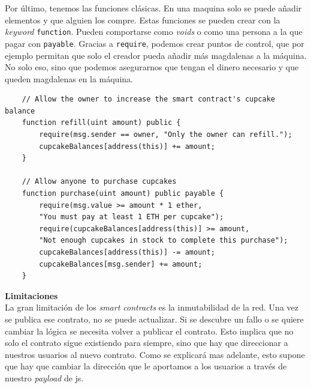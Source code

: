 Por último, tenemos las funciones clásicas. En una maquina solo se puede añadir elementos y que alguien los compre. Estas funciones se pueden crear con la \textit{keyword} \verb|function|. Pueden comportarse como \textit{voids} o como una persona a la que pagar con \verb|payable|.
Gracias a \verb|require|, podemos crear puntos de control, que por ejemplo permitan que solo el creador pueda añadir más magdalenas a la máquina. No solo eso, sino que podemos asegurarnos que tengan el dinero necesario y que queden magdalenas en la máquina.
\begin{lstlisting}
    // Allow the owner to increase the smart contract's cupcake balance
    function refill(uint amount) public {
        require(msg.sender == owner, "Only the owner can refill.");
        cupcakeBalances[address(this)] += amount;
    }

    // Allow anyone to purchase cupcakes
    function purchase(uint amount) public payable {
        require(msg.value >= amount * 1 ether, 
        "You must pay at least 1 ETH per cupcake");
        require(cupcakeBalances[address(this)] >= amount, 
        "Not enough cupcakes in stock to complete this purchase");
        cupcakeBalances[address(this)] -= amount;
        cupcakeBalances[msg.sender] += amount;
    }
\end{lstlisting}
\textbf{Limitaciones}\\
La gran limitación de los \textit{smart contracts} es la inmutabilidad de la red. Una vez se publica ese contrato, no se puede actualizar. Si se descubre un fallo o se quiere cambiar la lógica se necesita volver a publicar el contrato. Esto implica que no solo el contrato sigue existiendo para siempre, sino que hay que direccionar a nuestros usuarios al nuevo contrato.
Como se explicará mas adelante, esto supone que hay que cambiar la dirección que le aportamos a los usuarios a través de nuestro \textit{payload} de js.
